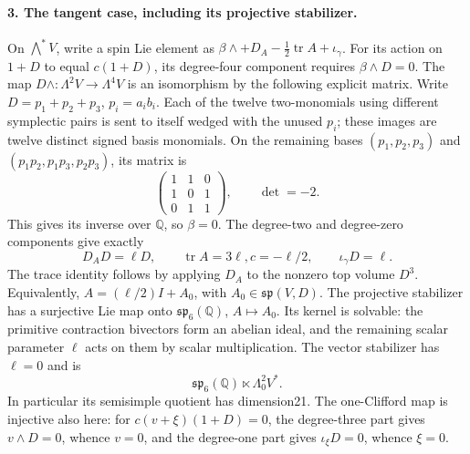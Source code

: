 \paragraph{3. The tangent case, including its projective stabilizer.}
On \(\bigwedge^*V\), write a spin Lie element as
\(\beta\wedge+D_A-\tfrac12\operatorname{tr}A+\iota_\gamma\).
For its action on \(1+D\) to equal \(c(1+D)\), its
degree-four component requires \(\beta\wedge D=0\).
The map \(D\wedge:\Lambda^2V\to\Lambda^4V\) is an
isomorphism by the following explicit matrix. Write
\(D=p_1+p_2+p_3\), \(p_i=a_i b_i\). Each of the twelve
two-monomials using different symplectic pairs is sent to
itself wedged with the unused \(p_i\); these images are
twelve distinct signed basis monomials. On the remaining
bases \((p_1,p_2,p_3)\) and
\((p_1p_2,p_1p_3,p_2p_3)\), its matrix is
\[
 \begin{pmatrix}1&1&0\\1&0&1\\0&1&1\end{pmatrix},
                         \qquad\det=-2.
\]
This gives its inverse over \(\mathbb Q\), so \(\beta=0\).
The degree-two and degree-zero components give exactly
\[
 D_AD=\ell D,\qquad \operatorname{tr}A=3\ell,
              c=-\ell/2,\qquad\iota_\gamma D=\ell.
                                                               \tag{R13.10}
\]
The trace identity follows by applying \(D_A\) to the
nonzero top volume \(D^3\). Equivalently,
\(A=(\ell/2)I+A_0\), with \(A_0\in\mathfrak{sp}(V,D)\).
The projective stabilizer has a surjective Lie map onto
\(\mathfrak{sp}_6(\mathbb Q)\), \(A\mapsto A_0\).
Its kernel is solvable: the primitive contraction bivectors
form an abelian ideal, and the remaining scalar parameter
\(\ell\) acts on them by scalar multiplication. The
vector stabilizer has \(\ell=0\) and is
\[
       \mathfrak{sp}_6(\mathbb Q)\ltimes\Lambda^2_0V^*.
                                                               \tag{R13.11}
\]
In particular its semisimple quotient has dimension21.
The one-Clifford map is injective also here: for
\(c(v+\xi)(1+D)=0\), the degree-three part gives
\(v\wedge D=0\), whence \(v=0\), and the degree-one
part gives \(\iota_\xi D=0\), whence \(\xi=0\).

